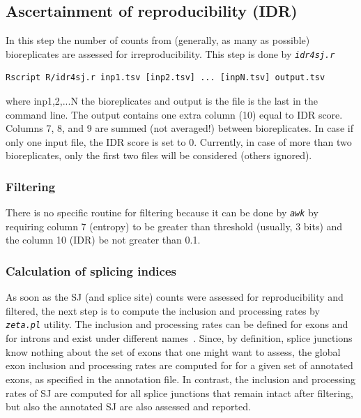 \documentclass{article}
\newcommand{\prog}[1]{{\tt\em #1}}
\begin{document}
\subsection{Ascertainment of reproducibility (IDR)}
In this step the number of counts from (generally, as many as possible) bioreplicates are assessed for irreproducibility. This step is done by \prog{idr4sj.r}
\begin{verbatim}
Rscript R/idr4sj.r inp1.tsv [inp2.tsv] ... [inpN.tsv] output.tsv
\end{verbatim}
where inp1,2,...N the bioreplicates and output is the file is the last in the command line. The output contains one extra column (10) equal to IDR score.
Columns 7, 8, and 9 are summed (not averaged!) between bioreplicates. 
In case if only one input file, the IDR score is set to 0. Currently, in case of more than two bioreplicates, only the first two files will be considered (others ignored).


\subsubsection{Filtering}

There is no specific routine for filtering because it can be done by \prog{awk} by requiring column 7 (entropy)
to be greater than threshold (usually, 3 bits) and the column 10 (IDR) be not greater than 0.1.


\subsubsection{Calculation of splicing indices}
As soon as the SJ (and splice site) counts were assessed for reproducibility and filtered, the next step is to compute the inclusion and processing rates by \prog{zeta.pl} utility.
The inclusion and processing rates can be defined for exons and for introns and exist under different names~\cite{pmid23172860}. Since, by definition, splice junctions 
know nothing about the set of exons that one might want to assess, the  global exon inclusion and processing rates are computed for for a given set of 
annotated exons, as specified in the annotation file. In contrast, the inclusion and processing rates of SJ are computed for all splice junctions that remain
intact after filtering, but also the annotated SJ are also assessed and reported.
\end{document}

